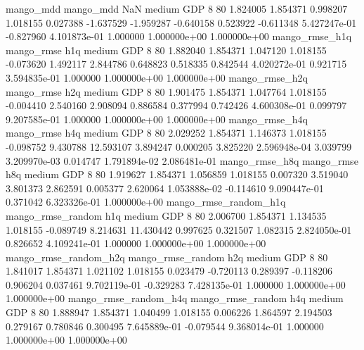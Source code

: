             mango_mdd         mango_mdd                  NaN     medium      GDP                 8 80  1.824005       1.854371 0.998207       1.018155    0.027388     -1.637529     -1.959287    -0.640158       0.523922 -0.611348 5.427247e-01    -0.827960   4.101873e-01            1.000000    1.000000e+00        1.000000e+00
       mango_rmse_h1q        mango_rmse                  h1q     medium      GDP                 8 80  1.882040       1.854371 1.047120       1.018155   -0.073620      1.492117      2.844786     0.648823       0.518335  0.842544 4.020272e-01     0.921715   3.594835e-01            1.000000    1.000000e+00        1.000000e+00
       mango_rmse_h2q        mango_rmse                  h2q     medium      GDP                 8 80  1.901475       1.854371 1.047764       1.018155   -0.004410      2.540160      2.908094     0.886584       0.377994  0.742426 4.600308e-01     0.099797   9.207585e-01            1.000000    1.000000e+00        1.000000e+00
       mango_rmse_h4q        mango_rmse                  h4q     medium      GDP                 8 80  2.029252       1.854371 1.146373       1.018155   -0.098752      9.430788     12.593107     3.894247       0.000205  3.825220 2.596948e-04     3.039799   3.209970e-03            0.014747    1.791894e-02        2.086481e-01
       mango_rmse_h8q        mango_rmse                  h8q     medium      GDP                 8 80  1.919627       1.854371 1.056859       1.018155    0.007320      3.519040      3.801373     2.862591       0.005377  2.620064 1.053888e-02    -0.114610   9.090447e-01            0.371042    6.323326e-01        1.000000e+00
mango_rmse_random_h1q mango_rmse_random                  h1q     medium      GDP                 8 80  2.006700       1.854371 1.134535       1.018155   -0.089749      8.214631     11.430442     0.997625       0.321507  1.082315 2.824050e-01     0.826652   4.109241e-01            1.000000    1.000000e+00        1.000000e+00
mango_rmse_random_h2q mango_rmse_random                  h2q     medium      GDP                 8 80  1.841017       1.854371 1.021102       1.018155    0.023479     -0.720113      0.289397    -0.118206       0.906204  0.037461 9.702119e-01    -0.329283   7.428135e-01            1.000000    1.000000e+00        1.000000e+00
mango_rmse_random_h4q mango_rmse_random                  h4q     medium      GDP                 8 80  1.888947       1.854371 1.040499       1.018155    0.006226      1.864597      2.194503     0.279167       0.780846  0.300495 7.645889e-01    -0.079544   9.368014e-01            1.000000    1.000000e+00        1.000000e+00
